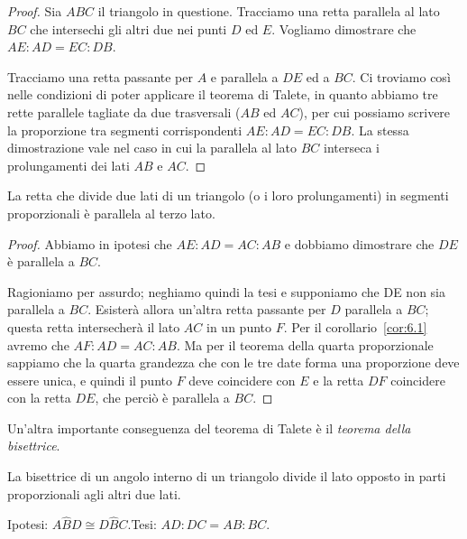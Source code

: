 \begin{proof}
Sia $ABC$ il triangolo in questione. Tracciamo una retta parallela al lato $BC$ che intersechi gli altri due nei punti $D$ ed $E$. Vogliamo dimostrare che $AE : AD = EC : DB$.

Tracciamo una retta passante per $A$ e parallela a $DE$ ed a $BC$. Ci troviamo così nelle condizioni di poter applicare il teorema di Talete, in quanto abbiamo tre rette parallele tagliate da due trasversali ($AB$ ed $AC$), per cui possiamo scrivere la proporzione tra segmenti corrispondenti $AE : AD = EC : DB$.
La stessa dimostrazione vale nel caso in cui la parallela al lato $BC$ interseca i prolungamenti dei lati $AB$ e $AC$.
\end{proof}

\begin{corollario}\label{cor:6.2}
La retta che divide due lati di un triangolo (o i loro prolungamenti) in segmenti proporzionali è parallela al terzo lato.
\end{corollario}

\begin{proof}
Abbiamo in ipotesi che $AE : AD = AC : AB$ e dobbiamo dimostrare che $DE$ è parallela a $BC$.

Ragioniamo per assurdo; neghiamo quindi la tesi e supponiamo che DE non sia parallela a $BC$. Esisterà allora un'altra retta passante per $D$ parallela a $BC$; questa retta intersecherà il lato $AC$ in un punto $F$. Per il corollario~\ref{cor:6.1} avremo che $AF : AD = AC : AB$.
Ma per il teorema della quarta proporzionale sappiamo che la quarta grandezza che con le tre date forma una proporzione deve essere unica, e quindi il punto $F$ deve coincidere con $E$ e la retta $DF$ coincidere con la retta $DE$, che perciò è parallela a $BC$.
\end{proof}

Un'altra importante conseguenza del teorema di Talete è il \emph{teorema della bisettrice}.
\begin{teorema}
La bisettrice di un angolo interno di un triangolo divide il lato opposto in parti proporzionali agli altri due lati.
\end{teorema}

\noindent Ipotesi: $A\widehat{B}D\cong D\widehat{B}C$.\tab Tesi: $AD : DC = AB : BC$.

